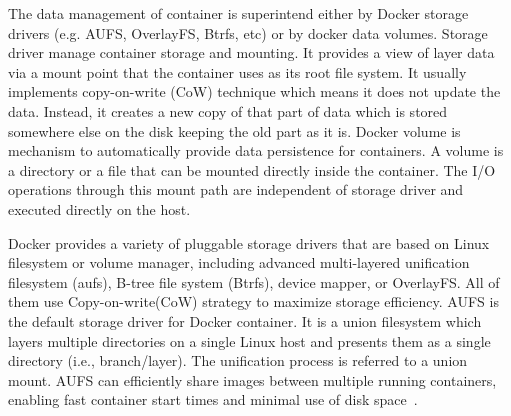 %
The data management of container is superintend either by Docker storage drivers (e.g. AUFS, OverlayFS, Btrfs, etc) or by docker data volumes.
%
Storage driver manage container storage and mounting.
%
It provides a view of layer data via a mount point that the container uses as its root file system.
%
It usually implements copy-on-write (CoW) technique which means it does not update the data.
%
Instead, it creates a new copy of that part of data which is stored somewhere else on the disk keeping the old part as it is.
%
%
Docker volume is mechanism to automatically provide data persistence for containers.
%
A volume is a directory or a file that can be mounted directly inside the container.
%
The I/O operations through this mount path are independent of storage driver and executed directly on the host. 



Docker provides a variety of pluggable storage drivers that are based on Linux filesystem or volume manager, including advanced multi-layered unification filesystem (aufs), B-tree file system (Btrfs), device mapper, or OverlayFS.
%
All of them use Copy-on-write(CoW) strategy to maximize storage efficiency.
%
AUFS is the default storage driver for Docker container.
%
%
It is a union filesystem which layers multiple directories on a single Linux
host and presents them as a single directory (i.e., branch/layer).
%
The unification process is referred to a union mount.
%
AUFS can efficiently share images between multiple running containers, enabling
fast container start times and minimal use of disk space~\cite{xxx}. 




